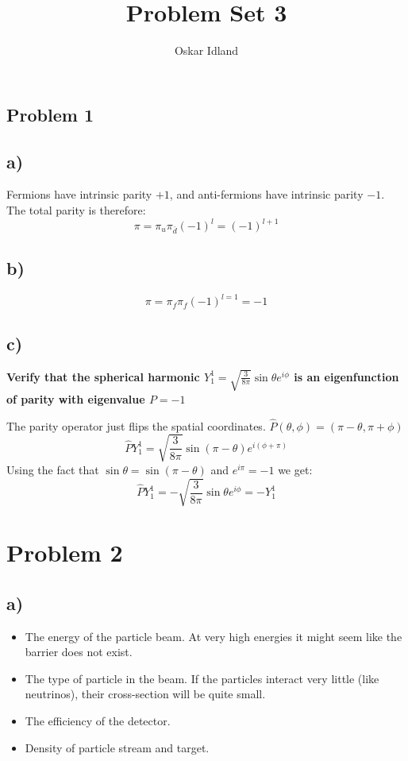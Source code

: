 \documentclass{article}
\author{Oskar Idland}
\title{Problem Set 3}
\date{}
\begin{document}
\maketitle
\newpage
\subsection*{Problem 1}
\subsection*{a)}
Fermions have intrinsic parity $+1$, and anti-fermions have intrinsic parity $-1$. The total parity is therefore:
\begin{equation}
  π = π_{u}π_{\bar{d}}(-1)^{l} = (-1)^{l+1}
\end{equation}

\subsection*{b)}
\begin{equation}
  π = π_f π_f (-1)^{l=1} = -1
\end{equation}

\subsection*{c)}
\begin{mdframed}
  \textbf{Verify that the spherical harmonic $Y_1^{1} = \sqrt{\frac{3}{8π}}\sin θ e^{iϕ}$ is an eigenfunction of parity with eigenvalue $P = -1$}
\end{mdframed}
The parity operator just flips the spatial coordinates. $\hat{P}(θ,ϕ) = (π-θ,π+ϕ)$
\begin{equation}
  \hat{P}Y_1^{1} = \sqrt{\frac{3}{8π}} \sin (π-θ) e^{i(ϕ + π)}
\end{equation}
Using the fact that $\sin θ = \sin (π-θ)$ and $e^{iπ} = -1$ we get:
\begin{equation}
  \hat{P}Y_1^{1} = - \sqrt{\frac{3}{8π}}\sin θ e^{iϕ} = - Y_1^{1}
\end{equation}


\section*{Problem 2}
\subsection*{a)}
\begin{itemize}
  \item The energy of the particle beam. At very high energies it might seem like the barrier does not exist. 
  \item The type of particle in the beam. If the particles interact very little (like neutrinos), their cross-section will be quite small. 
  \item The efficiency of the detector. 
  \item Density of particle stream and target. 
\end{itemize}
\end{document}
